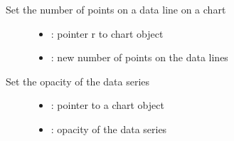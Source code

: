 \documentclass[letterpaper,10pt,english]{sphinxmanual}
\begin{document}

\begin{fulllineitems}
\label{\detokenize{object-types/chart:_CPPv424lv_chart_set_point_countP8lv_obj_t8uint16_t}}%
\pysigstartmultiline
{}\label{\detokenize{object-types/chart:lv__chart_8h_1a81b810669221ef6d5a8aee37506dd715}}%
\pysigstopmultiline
Set the number of points on a data line on a chart \begin{description}
\item[{}] \leavevmode\begin{itemize}
\item {} 
: pointer r to chart object 

\item {} 
: new number of points on the data lines 

\end{itemize}

\end{description}


\end{fulllineitems}


\begin{fulllineitems}
\label{\detokenize{object-types/chart:_CPPv423lv_chart_set_series_opaP8lv_obj_t8lv_opa_t}}%
\pysigstartmultiline
{}\label{\detokenize{object-types/chart:lv__chart_8h_1a20ebf42d999e7849011fe97843da816e}}%
\pysigstopmultiline
Set the opacity of the data series \begin{description}
\item[{}] \leavevmode\begin{itemize}
\item {} 
: pointer to a chart object 

\item {} 
: opacity of the data series 

\end{itemize}

\end{description}


\end{fulllineitems}
\end{document}
